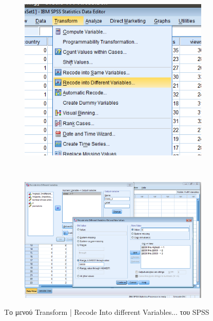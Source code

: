 \documentclass{assignment}
\begin{document}
\begin{Assignment}[Μέρος Α]
\begin{figure}[htbp]
  \centering
  \begin{subfigure}[b]{0.5\textwidth}
     \includegraphics[width=\textwidth,height=0.25\textheight]{images/menu_views_2.png}
  \end{subfigure}%
   ~ %
  \begin{subfigure}[b]{0.5\textwidth}
    \includegraphics[width=\textwidth,height=0.25\textheight]{images/views_2.png}
  \end{subfigure}
  \caption{Το μενού Transform | Recode Into different Variables... του SPSS}
\label{fig:Views_2}
\end{figure}


\end{Assignment}
\end{document}
